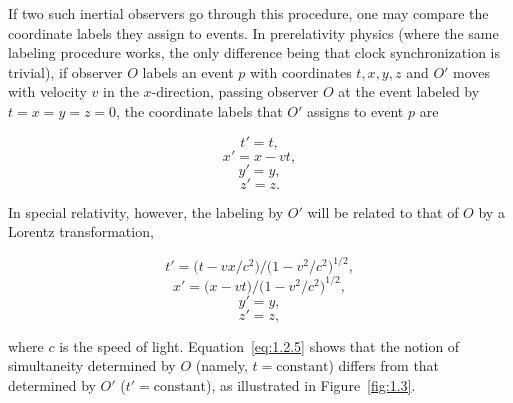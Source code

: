 If two such inertial observers go through this procedure, one may compare the
coordinate labels they assign to events. In prerelativity physics (where the same
labeling procedure works, the only difference being that clock synchronization is
trivial), if observer \(O\) labels an event \(p\) with coordinates \(t, x, y, z\) and
\(O'\) moves with velocity \(v\) in the \(x\)-direction, passing observer \(O\) at the
event labeled by \(t = x = y = z = 0\), the coordinate labels that \(O'\) assigns to
event \(p\) are

\begin{equation}
  t' = t,
  \tag{1.2.1}\label{eq:1.2.1}
\end{equation}
\begin{equation}
  x' = x-vt,
  \tag{1.2.2}\label{eq:1.2.2}
\end{equation}
\begin{equation}
  y' = y,
  \tag{1.2.3}\label{eq:1.2.3}
\end{equation}
\begin{equation}
  z' = z.
  \tag{1.2.4}\label{eq:1.2.4}
\end{equation}

In special relativity, however, the labeling by \(O'\) will be related to that of \(O\)
by a Lorentz transformation,

\begin{equation}
  t' = \bigl(t-vx/c^2\bigr)/\bigl(1-v^2/c^2\bigr)^{1/2},
  \tag{1.2.5}\label{eq:1.2.5}
\end{equation}
\begin{equation}
  x' = \bigl(x-vt\bigr)/\bigl(1-v^2/c^2\bigr)^{1/2},
  \tag{1.2.6}\label{eq:1.2.6}
\end{equation}
\begin{equation}
  y' = y,
  \tag{1.2.7}\label{eq:1.2.7}
\end{equation}
\begin{equation}
  z' = z,
  \tag{1.2.8}\label{eq:1.2.8}
\end{equation}

where \(c\) is the speed of light. Equation~\eqref{eq:1.2.5} shows that the notion
of simultaneity determined by \(O\) (namely, \(t = \text{constant}\)) differs from
that determined by \(O'\) (\(t' = \text{constant}\)), as illustrated in
Figure~\ref{fig:1.3}.


